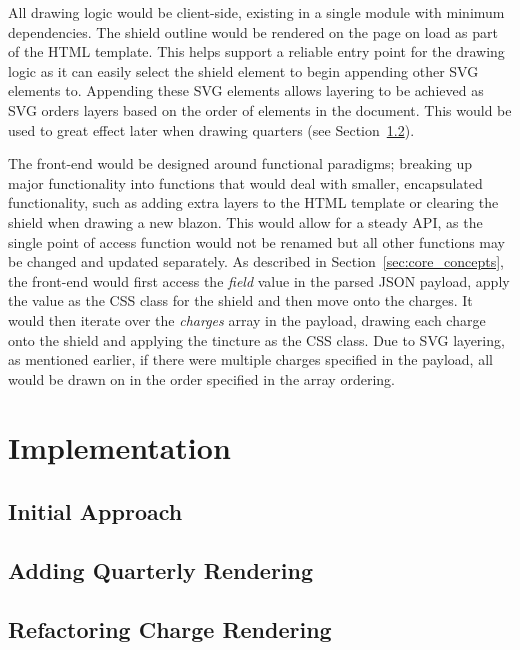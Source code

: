 \documentclass[nobib, a4paper, twoside, justified]{tufte-book}
\begin{document}
All drawing logic would be client-side, existing in a single module with minimum dependencies. The
shield outline would be rendered on the page on load as part of the HTML template. This helps
support a reliable entry point for the drawing logic as it can easily select the shield element to
begin appending other SVG elements to. Appending these SVG elements allows layering to be achieved
as SVG orders layers based on the order of elements in the document. This would be used to great
effect later when drawing quarters (see Section~\ref{sec:adding_quarterly_rendering}).

The front-end would be designed around functional paradigms; breaking up major functionality into
functions that would deal with smaller, encapsulated functionality, such as adding extra layers to
the HTML template or clearing the shield when drawing a new blazon. This would allow for a steady
API, as the single point of access function would not be renamed but all other functions may be
changed and updated separately. As described in Section~\ref{sec:core_concepts}, the front-end
would first access the \textit{field} value in the parsed JSON payload, apply the value as the CSS
class for the shield and then move onto the charges. It would then iterate over the
\textit{charges} array in the payload, drawing each charge onto the shield and applying the
tincture as the CSS class. Due to SVG layering, as mentioned earlier, if there were multiple
charges specified in the payload, all would be drawn on in the order specified in the array
ordering.

\chapter{Implementation}%
\label{cha:implementation}

\section{Initial Approach}%
\label{sec:initial_approach}

\section{Adding Quarterly Rendering}%
\label{sec:adding_quarterly_rendering}

\section{Refactoring Charge Rendering}%
\label{sec:refactoring_charge_rendering}
\end{document}
